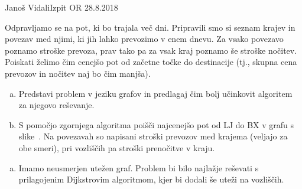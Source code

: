 \begin{naloga}{Janoš Vidali}{Izpit OR 28.8.2018}
\begin{vprasanje}
Odpravljamo se na pot, ki bo trajala več dni.
Pripravili smo si seznam krajev in povezav med njimi,
ki jih lahko prevozimo v enem dnevu.
Za vsako povezavo poznamo stroške prevoza,
prav tako pa za vsak kraj poznamo še stroške nočitev.
Poiskati želimo čim cenejšo pot od začetne točke do destinacije
(tj., skupna cena prevozov in nočitev naj bo čim manjša).

\begin{enumerate}[(a)]
\item Predstavi problem v jeziku grafov
in predlagaj čim bolj učinkovit algoritem za njegovo reševanje.

\item S pomočjo zgornjega algoritma poišči najcenejšo pot od LJ do BX
v grafu s slike~\fig[pocitnice].
Na povezavah so napisani stroški prevozov med krajema
(veljajo za obe smeri),
pri vozliščih pa stroški prenočitve v kraju.
\end{enumerate}
\end{vprasanje}




\begin{odgovor}
\begin{enumerate}[(a)]
\item Imamo neusmerjen utežen graf. Problem bi bilo najlažje reševati s prilagojenim Dijkstrovim algoritmom, kjer bi dodali še uteži na vozliščih.


\end{enumerate}
\end{odgovor}
\end{naloga}
